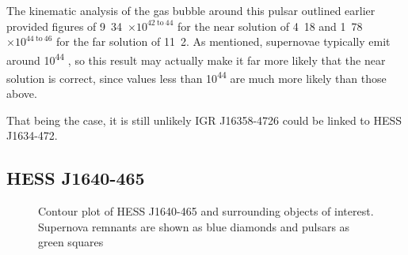 \documentclass[a4paper, titlepage, oneside]{article}
\newcommand{\e}[1]{\ensuremath{\times 10^{#1}}}
\newcommand{\parsec}{\mathrm{pc}}
\begin{document}
\begin{multicols}{2}
The kinematic analysis of the gas bubble around this pulsar outlined earlier provided figures of \unit{9.34\e{42 \mathrm{~to~} 44}}{\joule} for the near solution of \unit{4.18}{\kilo\parsec} and \unit{1.78\e{44 \mathrm{~to~} 46}}{\joule} for the far solution of \unit{11.2}{\kilo\parsec}. As mentioned, supernovae typically emit around \unit{10^{44}}{\joule} \parencite{Khokhlov:1993}, so this result may actually make it far more likely that the near solution is correct, since values less than \unit{10^{44}} are much more likely than those above.

That being the case, it is still unlikely IGR J16358-4726 could be linked to HESS J1634-472.

\subsection{HESS J1640-465}

\begin{figure}[H]
  \centering
  \caption{Contour plot of HESS J1640-465 and surrounding objects of interest. Supernova remnants are shown as blue diamonds and pulsars as green squares}
  \label{fig:hess40}
\end{figure}


\end{multicols}
\end{document}
